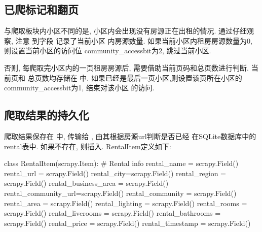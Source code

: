 \subsection{已爬标记和翻页}
与爬取板块内小区不同的是, 小区内会出现没有房源正在出租的情况. 通过仔细观察, 注意
到字段  记录了当前小区
内房源数量. 如果当前小区内租房房源数量为0, 则设置当前小区的访问位
community\_accessbit为2, 跳过当前小区.

否则, 每爬取完小区内的一页租房房源后, 需要借助当前页码和总页数进行判断. 当前页和
总页数均存储在 中.
如果已经是最后一页小区,则设置该页所在小区的community\_accessbit为1, 结束对该小区
的访问.

\subsection{爬取结果的持久化}
爬取结果保存在 中, 传输给
, 由其根据房源url判断是否已经
在SQLite数据库中的rental表中. 如果不存在, 则插入. RentalItem定义如下:
\begin{python}
    class RentalItem(scrapy.Item):
    # Rental info
    rental_name = scrapy.Field()
    rental_url = scrapy.Field()
    rental_city=scrapy.Field()
    rental_region = scrapy.Field()
    rental_business_area = scrapy.Field()
    rental_community_url=scrapy.Field()
    rental_community = scrapy.Field()
    rental_area = scrapy.Field()
    rental_lighting = scrapy.Field()
    rental_rooms = scrapy.Field()
    rental_liverooms = scrapy.Field()
    rental_bathrooms = scrapy.Field()
    rental_price = scrapy.Field()
    rental_timestamp = scrapy.Field()
\end{python}